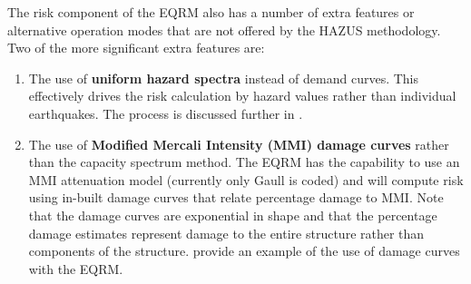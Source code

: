The risk component of the EQRM also has a number of extra features
or alternative operation modes that are not offered by the HAZUS
methodology. Two of the more significant extra features are:
\begin{enumerate}
\item The use of \textbf{uniform hazard spectra} instead of demand
curves. This effectively drives the risk
calculation by hazard values rather than individual earthquakes.
The process is discussed further in \citet{dr_Patchett04a}. 
\item The use of \textbf{Modified Mercali Intensity (MMI) damage
curves} rather than the capacity spectrum method. The EQRM has the capability to use an MMI
attenuation model (currently only Gaull is coded) and will compute
risk using in-built damage curves that relate percentage damage to
MMI. Note that the damage curves are exponential in shape and that
the percentage damage estimates represent damage to the entire
structure rather than components of the structure.
\cite{dr_Edwards04a} provide an example of the use of damage
curves with the EQRM.
\end{enumerate}

